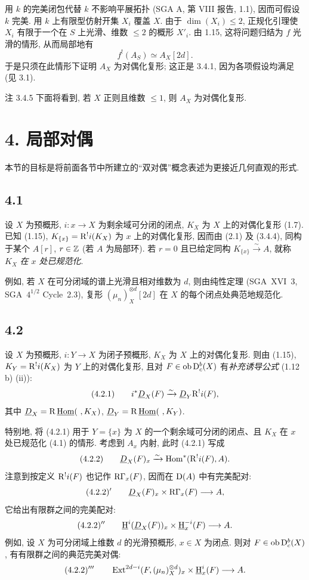 \begin{prooftext}
用 $k$ 的完美闭包代替 $k$ 不影响平展拓扑 (SGA A, 第 VIII 报告, 1.1), 因而可假设 $k$ 完美. 用 $k$ 上有限型仿射开集 $X_i$ 覆盖 $X$. 由于 $\dim(X_i)\le2$, 正规化引理使 $X_i$ 有限于一个在 $S$ 上光滑、维数 $\le2$ 的概形 $X'_i$. 由 1.15, 这将问题归结为 $f$ 光滑的情形, 从而局部地有
\[
   f^!(A_S)\simeq A_X[2d].
\]
于是只须在此情形下证明 $A_X$ 为对偶化复形; 这正是 3.4.1, 因为各项假设均满足 (见 3.1). \qedtext
\end{prooftext}

\begin{statement}{注 3.4.5}
下面将看到, 若 $X$ 正则且维数 $\le1$, 则 $A_X$ 为对偶化复形.
\end{statement}

\section*{4. 局部对偶}

本节的目标是将前面各节中所建立的“双对偶”概念表述为更接近几何直观的形式.

\subsection*{4.1}
设 $X$ 为预概形, $i:x\to X$ 为剩余域可分闭的闭点, $K_X$ 为 $X$ 上的对偶化复形 (1.7). 已知 (1.15), $K_{\{x\}}=\mathrm R^{!}i(K_X)$ 为 $x$ 上的对偶化复形, 因而由 (2.1) 及 (3.4.4), 同构于某个 $A[r]$, $r\in\mathbb Z$ (若 $A$ 为局部环). 若 $r=0$ 且已给定同构 $K_{\{x\}}\xrightarrow{\sim}A$, 就称 $K_X$ \emph{在 $x$ 处已规范化}.

例如, 若 $X$ 在可分闭域的谱上光滑且相对维数为 $d$, 则由纯性定理 (SGA~XVI~3, SGA~$4^{1/2}$ Cycle~2.3), 复形 $(\mu_n)_X^{\otimes d}[2d]$ 在 $X$ 的每个闭点处典范地规范化.

\subsection*{4.2}
设 $X$ 为预概形, $i:Y\to X$ 为闭子预概形, $K_X$ 为 $X$ 上的对偶化复形. 则由 (1.15), $K_Y=\mathrm R^{!}i(K_X)$ 为 $Y$ 上的对偶化复形, 且对 $F\in \operatorname{ob}\mathrm{D}_c^b(X)$ 有\emph{补充诱导公式} (1.12 b) (ii)):
\[
(4.2.1)\qquad i^*\underline{D}_X(F)\xrightarrow{\sim}\underline{D}_Y\mathrm R^{!}i(F),
\]
其中 $\underline{D}_X=\R\,\underline{\Hom}(\ ,K_X)$, $\underline{D}_Y=\R\,\underline{\Hom}(\ ,K_Y)$.

特别地, 将 (4.2.1) 用于 $Y=\{x\}$ 为 $X$ 的一个剩余域可分闭的闭点、且 $K_X$ 在 $x$ 处已规范化 (4.1) 的情形. 考虑到 $A_x$ 内射, 此时 (4.2.1) 写成
\[
(4.2.2)\qquad \underline{D}_X(F)_x\xrightarrow{\sim}\operatorname{Hom}^*(\mathrm R^{!}i(F),A).
\]
注意到按定义 $\mathrm R^{!}i(F)$ 也记作 $\mathrm R\Gamma_x(F)$, 因而在 $\mathrm{D}(A)$ 中有完美配对:
\[
(4.2.2)'\qquad \underline{D}_X(F)_x\times \mathrm R\Gamma_x(F)\longrightarrow A,
\]
它给出有限群之间的完美配对:
\[
(4.2.2)''\qquad \underline{\mathrm H}^i(\underline{D}_X(F))_x\times \underline{\mathrm H}_x^{-i}(F)\longrightarrow A.
\]
例如, 设 $X$ 为可分闭域上维数 $d$ 的光滑预概形, $x\in X$ 为闭点. 则对 $F\in\operatorname{ob}\mathrm{D}_c^b(X)$, 有有限群之间的典范完美对偶:
\[
(4.2.2)'''\qquad \operatorname{Ext}^{2d-i}(F,(\mu_n)_X^{\otimes d})_x\times \underline{\mathrm H}_x^i(F)\longrightarrow A.
\]

